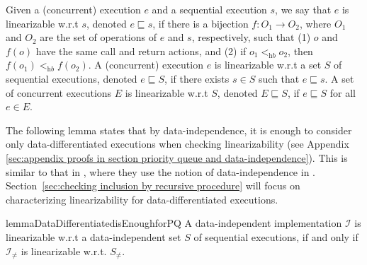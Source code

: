 Given a (concurrent) execution $e$ and a sequential execution $s$, we say that $e$ is linearizable w.r.t $s$, denoted $e \sqsubseteq s$, if there is a bijection $f: O_1 \rightarrow O_2$, where $O_1$ and $O_2$ are the set of operations of $e$ and $s$, respectively, such that (1) $o$ and $f(o)$ have the same call and return actions, and (2) if $o_1 <_{\textit{hb}} o_2$, then $f(o_1) <_{\textit{hb}} f(o_2)$.
A (concurrent) execution $e$ is linearizable w.r.t a set $S$ of sequential executions, denoted $e \sqsubseteq S$, if there exists $s \in S$ such that $e \sqsubseteq s$. A set of concurrent executions $E$ is linearizable w.r.t $S$, denoted $E \sqsubseteq S$, if $e \sqsubseteq S$ for all $e \in E$.

The following lemma states that by data-independence, it is enough to consider only data-differentiated executions when checking linearizability (see Appendix \ref{sec:appendix proofs in section priority queue and data-independence}). This is similar to that in \cite{conf/tacas/AbdullaHHJR13,DBLP:conf/icalp/BouajjaniEEH15}, where they use the notion of data-independence in \cite{conf/popl/Wolper86}.
Section~\ref{sec:checking inclusion by recursive procedure} will focus on characterizing linearizability for data-differentiated executions. %

\begin{restatable}{lemma}{DataDifferentiatedisEnoughforPQ}
\label{lemma:data differentiated is enough for PQ}
A data-independent implementation $\mathcal{I}$ is linearizable w.r.t a data-independent set $S$ of sequential executions, if and only if $\mathcal{I}_{\neq}$ is linearizable w.r.t. $S_{\neq}$.
\end{restatable}


